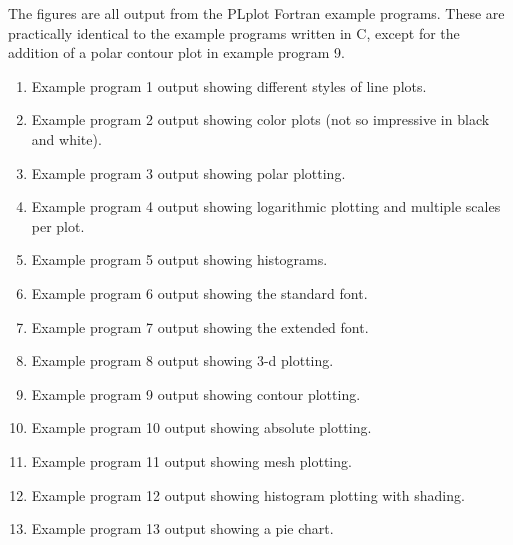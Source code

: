 

The figures are all output from the PLplot Fortran example programs.
These are practically identical to the example programs written in C,
except for the addition of a polar contour plot in example program 9.

\begin{enumerate}
\item
Example program 1 output showing different styles of line plots.

\item
Example program 2 output showing color plots (not so impressive
in black and white).

\item
Example program 3 output showing polar plotting.

\item
Example program 4 output showing logarithmic plotting and multiple scales
per plot.

\item
Example program 5 output showing histograms.

\item
Example program 6 output showing the standard font.

\item
Example program 7 output showing the extended font.

\item
Example program 8 output showing 3-d plotting.

\item
Example program 9 output showing contour plotting.

\item
Example program 10 output showing absolute plotting.

\item
Example program 11 output showing mesh plotting.

\item
Example program 12 output showing histogram plotting with shading.

\item
Example program 13 output showing a pie chart.

\end{enumerate}

